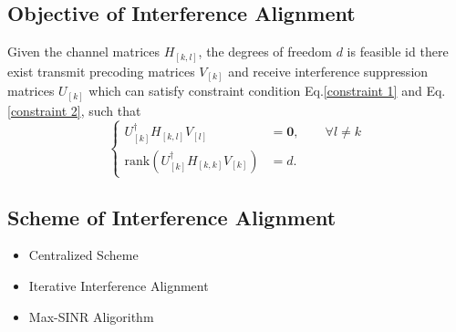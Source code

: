 \documentclass[12pt, onecolumn]{IEEEtran}
\begin{document}
\subsection{Objective of Interference Alignment}
Given the channel matrices $H_{[k,l]}$, the degrees of freedom $d$ is feasible id there exist transmit precoding matrices $V_{[k]}$ and receive interference suppression matrices $U_{[k]}$ which can satisfy constraint  condition Eq.\eqref{constraint 1} and Eq.\eqref{constraint 2}, such that
\begin{equation}
   \left\{
        \begin{aligned}
                 U_{[k]}^{\dag}H_{[k,l]}V_{[l]} &= \textbf{0}, \qquad{} \forall l\neq{}k  \\
                 \text{rank}(U_{[k]}^{\dag}H_{[k,k]}V_{[k]}) &= d.
        \end{aligned}
   \right.
\end{equation}

\subsection{Scheme of Interference Alignment}
\begin{itemize}
  \item Centralized Scheme
  \item Iterative Interference Alignment
  \item Max-SINR Aligorithm
\end{itemize}
\end{document}
